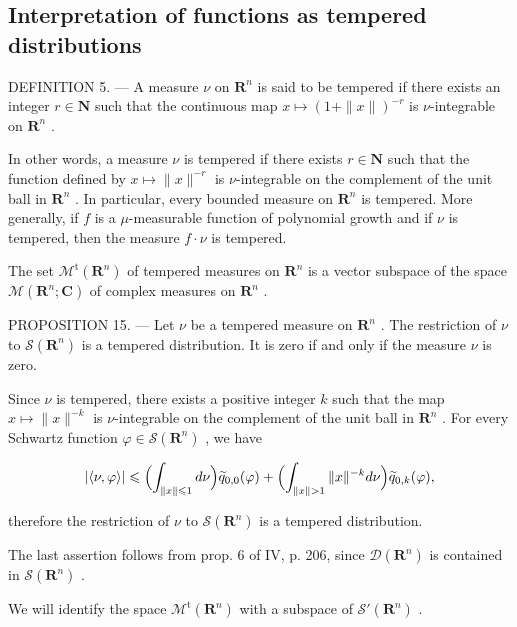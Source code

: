 \subsection{Interpretation of functions as tempered distributions}

DEFINITION 5. --- A measure \(\nu\) on \(\mathbf{R}^{n}\) is said to be tempered if there exists an integer \(r \in \mathbf{N}\) such that the continuous map \(x \mapsto (1 + \|x\|)^{-r}\) is \(\nu\)-integrable on \(\mathbf{R}^{n}\) .

In other words, a measure \(\nu\) is tempered if there exists \(r \in \mathbf{N}\) such that the function defined by \(x \mapsto \| x\|^{-r}\) is \(\nu\)-integrable on the complement of the unit ball in \(\mathbf{R}^n\) . In particular, every bounded measure on \(\mathbf{R}^n\) is tempered. More generally, if \(f\) is a \(\mu\)-measurable function of polynomial growth and if \(\nu\) is tempered, then the measure \(f \cdot \nu\) is tempered.

The set \(\mathcal{M}^{\mathrm{t}}(\mathbf{R}^{n})\) of tempered measures on \(\mathbf{R}^{n}\) is a vector subspace of the space \(\mathcal{M}(\mathbf{R}^{n};\mathbf{C})\) of complex measures on \(\mathbf{R}^{n}\) .

PROPOSITION 15. --- Let \(\nu\) be a tempered measure on \(\mathbf{R}^{n}\) . The restriction of \(\nu\) to \(\mathcal{S}(\mathbf{R}^{n})\) is a tempered distribution. It is zero if and only if the measure \(\nu\) is zero.

Since \(\nu\) is tempered, there exists a positive integer \(k\) such that the map \(x \mapsto \| x\|^{-k}\) is \(\nu\)-integrable on the complement of the unit ball in \(\mathbf{R}^n\) . For every Schwartz function \(\varphi \in \mathcal{S}(\mathbf{R}^n)\) , we have

\[
| \langle \nu , \varphi \rangle | \leqslant \Bigl (\int_ {\| x \| \leqslant 1} d \nu \Bigr) \widetilde {q} _ {0, 0} (\varphi) + \Bigl (\int_ {\| x \| > 1} \| x \| ^ {- k} d \nu \Bigr) \widetilde {q} _ {0, k} (\varphi),
\]

therefore the restriction of \(\nu\) to \(\mathcal{S}(\mathbf{R}^n)\) is a tempered distribution.

The last assertion follows from prop. 6 of IV, p. 206, since \(\mathcal{D}(\mathbf{R}^n)\) is contained in \(\mathcal{S}(\mathbf{R}^n)\) .

We will identify the space \(\mathcal{M}^{\mathrm{t}}(\mathbf{R}^{n})\) with a subspace of \(\mathcal{S}'(\mathbf{R}^{n})\) .

